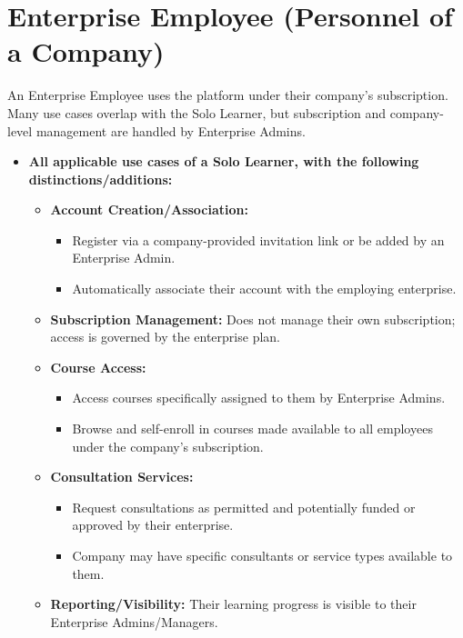 \documentclass[12pt, a4paper]{report} %
\begin{document}
\section{Enterprise Employee (Personnel of a Company)}
An Enterprise Employee uses the platform under their company's subscription. Many use cases overlap with the Solo Learner, but subscription and company-level management are handled by Enterprise Admins.
  \begin{itemize}
    \item \textbf{All applicable use cases of a Solo Learner, with the following distinctions/additions:}
        \begin{itemize}
            \item \textbf{Account Creation/Association:}
                \begin{itemize}
                    \item Register via a company-provided invitation link or be added by an Enterprise Admin.
                    \item Automatically associate their account with the employing enterprise.
                \end{itemize}
            \item \textbf{Subscription Management:} Does not manage their own subscription; access is governed by the enterprise plan.
            \item \textbf{Course Access:}
                \begin{itemize}
                    \item Access courses specifically assigned to them by Enterprise Admins.
                    \item Browse and self-enroll in courses made available to all employees under the company's subscription.
                \end{itemize}
            \item \textbf{Consultation Services:}
                \begin{itemize}
                    \item Request consultations as permitted and potentially funded or approved by their enterprise.
                    \item Company may have specific consultants or service types available to them.
                \end{itemize}
            \item \textbf{Reporting/Visibility:} Their learning progress is visible to their Enterprise Admins/Managers.
        \end{itemize}
  \end{itemize}
\end{document}

